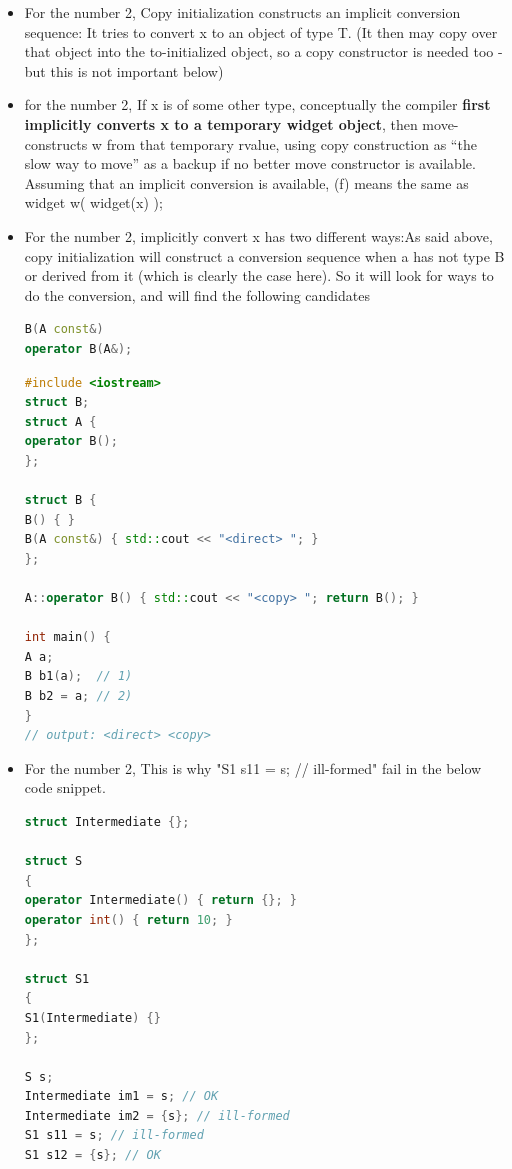 \documentclass[a4paper,12pt,twoside]{book}
\begin{document}
\begin{itemize}
\item For the number 2, Copy initialization constructs an implicit conversion sequence: It tries to convert x to an object of type T. (It then may copy over that object into the to-initialized object, so a copy constructor is needed too - but this is not important below)

\item for the number 2, If x is of some other type, conceptually the compiler \textbf{first implicitly converts x to a temporary widget object}, then move-constructs w from that temporary rvalue, using copy construction as “the slow way to move” as a backup if no better move constructor is available. Assuming that an implicit conversion is available, (f) means the same as widget w( widget(x) ); 

\item For the number 2, implicitly convert x has two different ways:As said above, copy initialization will construct a conversion sequence when a has not type B or derived from it (which is clearly the case here). So it will look for ways to do the conversion, and will find the following candidates

\begin{lstlisting}[frame=single, language=c++]
B(A const&)
operator B(A&);
\end{lstlisting}

\begin{lstlisting}[frame=single, language=c++]
#include <iostream>
struct B;
struct A { 
operator B();
};

struct B { 
B() { }
B(A const&) { std::cout << "<direct> "; }
};

A::operator B() { std::cout << "<copy> "; return B(); }

int main() { 
A a;
B b1(a);  // 1)
B b2 = a; // 2)
}
// output: <direct> <copy>
\end{lstlisting}

\item For the number 2, This is why "S1 s11 = s; // ill-formed" fail in the below code snippet.
\begin{lstlisting}[frame=single, language=c++]
struct Intermediate {};

struct S
{
operator Intermediate() { return {}; }
operator int() { return 10; }
};

struct S1
{
S1(Intermediate) {}
};

S s;
Intermediate im1 = s; // OK
Intermediate im2 = {s}; // ill-formed
S1 s11 = s; // ill-formed
S1 s12 = {s}; // OK


\end{lstlisting}
\end{itemize}
\end{document}
